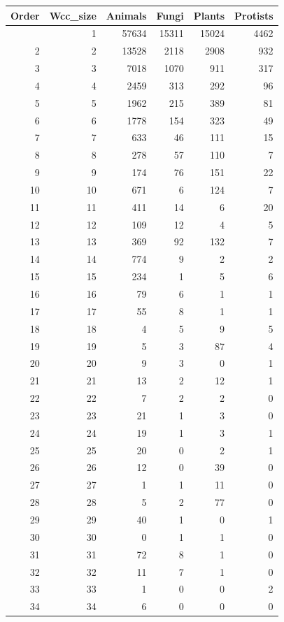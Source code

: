 \documentclass[
  letterpaper,
  DIV=11,
  numbers=noendperiod]{scrreprt}
\begin{document}
\begin{longtable}[]{@{}rrrrrr@{}}
\toprule\noalign{}
Order & Wcc\_size & Animals & Fungi & Plants & Protists \\
\midrule\noalign{}
\endhead
\bottomrule\noalign{}
\endlastfoot
1 & 1 & 57634 & 15311 & 15024 & 4462 \\
2 & 2 & 13528 & 2118 & 2908 & 932 \\
3 & 3 & 7018 & 1070 & 911 & 317 \\
4 & 4 & 2459 & 313 & 292 & 96 \\
5 & 5 & 1962 & 215 & 389 & 81 \\
6 & 6 & 1778 & 154 & 323 & 49 \\
7 & 7 & 633 & 46 & 111 & 15 \\
8 & 8 & 278 & 57 & 110 & 7 \\
9 & 9 & 174 & 76 & 151 & 22 \\
10 & 10 & 671 & 6 & 124 & 7 \\
11 & 11 & 411 & 14 & 6 & 20 \\
12 & 12 & 109 & 12 & 4 & 5 \\
13 & 13 & 369 & 92 & 132 & 7 \\
14 & 14 & 774 & 9 & 2 & 2 \\
15 & 15 & 234 & 1 & 5 & 6 \\
16 & 16 & 79 & 6 & 1 & 1 \\
17 & 17 & 55 & 8 & 1 & 1 \\
18 & 18 & 4 & 5 & 9 & 5 \\
19 & 19 & 5 & 3 & 87 & 4 \\
20 & 20 & 9 & 3 & 0 & 1 \\
21 & 21 & 13 & 2 & 12 & 1 \\
22 & 22 & 7 & 2 & 2 & 0 \\
23 & 23 & 21 & 1 & 3 & 0 \\
24 & 24 & 19 & 1 & 3 & 1 \\
25 & 25 & 20 & 0 & 2 & 1 \\
26 & 26 & 12 & 0 & 39 & 0 \\
27 & 27 & 1 & 1 & 11 & 0 \\
28 & 28 & 5 & 2 & 77 & 0 \\
29 & 29 & 40 & 1 & 0 & 1 \\
30 & 30 & 0 & 1 & 1 & 0 \\
31 & 31 & 72 & 8 & 1 & 0 \\
32 & 32 & 11 & 7 & 1 & 0 \\
33 & 33 & 1 & 0 & 0 & 2 \\
34 & 34 & 6 & 0 & 0 & 0 \\

\end{longtable}
\end{document}
